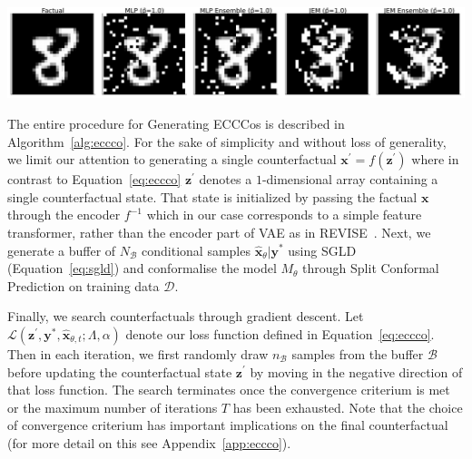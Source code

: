 \documentclass{article}
\begin{document}
\medskip

\begin{minipage}[c]{\textwidth}
  \includegraphics[width=\textwidth]{../artifacts/results/images/mnist_eccco.png}
  \label{fig:eccco-mnist}
\end{minipage}

\medskip

The entire procedure for Generating ECCCos is described in Algorithm~\ref{alg:eccco}. For the sake of simplicity and without loss of generality, we limit our attention to generating a single counterfactual $\mathbf{x}^\prime=f(\mathbf{z}^\prime)$ where in contrast to Equation~\ref{eq:eccco} $\mathbf{z}^\prime$ denotes a $1$-dimensional array containing a single counterfactual state. That state is initialized by passing the factual $\mathbf{x}$ through the encoder $f^{-1}$ which in our case corresponds to a simple feature transformer, rather than the encoder part of VAE as in REVISE~\citep{joshi2019realistic}. Next, we generate a buffer of $N_{\mathcal{B}}$ conditional samples $\hat{\mathbf{x}}_{\theta}|\mathbf{y}^*$ using SGLD (Equation~\ref{eq:sgld}) and conformalise the model $M_{\theta}$ through Split Conformal Prediction on training data $\mathcal{D}$.

Finally, we search counterfactuals through gradient descent. Let $\mathcal{L}(\mathbf{z}^\prime,\mathbf{y}^*,\hat{\mathbf{x}}_{\theta, t}; \Lambda, \alpha)$ denote our loss function defined in Equation~\ref{eq:eccco}. Then in each iteration, we first randomly draw $n_{\mathcal{B}}$ samples from the buffer $\mathcal{B}$ before updating the counterfactual state $\mathbf{z}^\prime$ by moving in the negative direction of that loss function. The search terminates once the convergence criterium is met or the maximum number of iterations $T$ has been exhausted. Note that the choice of convergence criterium has important implications on the final counterfactual (for more detail on this see Appendix~\ref{app:eccco}).
\end{document}
